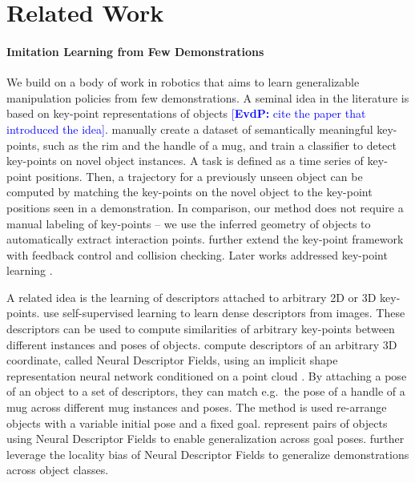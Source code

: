 \documentclass{article}
\newcommand{\evdp}[1]{\textcolor{blue}{[\textbf{EvdP:} #1]}}
\begin{document}
\section{Related Work}

\paragraph{Imitation Learning from Few Demonstrations} 

We build on a body of work in robotics that aims to learn generalizable manipulation policies from few demonstrations. A seminal idea in the literature is based on key-point representations of objects \evdp{cite the paper that introduced the idea}. \citet{manuelli19kpam} manually create a dataset of semantically meaningful key-points, such as the rim and the handle of a mug, and train a classifier to detect key-points on novel object instances. A task is defined as a time series of key-point positions. Then, a trajectory for a previously unseen object can be computed by matching the key-points on the novel object to the key-point positions seen in a demonstration. In comparison, our method does not require a manual labeling of key-points -- we use the inferred geometry of objects to automatically extract interaction points. \citet{gao21kpam,gao21kpamsc} further extend the key-point framework with feedback control and collision checking. Later works addressed key-point learning \cite{1910,vecerik20s3k,manuelli2 0keypoints,turpin21gift}.

A related idea is the learning of descriptors attached to arbitrary 2D or 3D key-points. \citet{florence18dense} use self-supervised learning to learn dense descriptors from images. These descriptors can be used to compute similarities of arbitrary key-points between different instances and poses of objects. \citet{chen22neural} compute descriptors of an arbitrary 3D coordinate, called Neural Descriptor Fields, using an implicit shape representation neural network conditioned on a point cloud \cite{mescheder19occupancy}. By attaching a pose of an object to a set of descriptors, they can match e.g.~the pose of a handle of a mug across different mug instances and poses. The method is used re-arrange objects with a variable initial pose and a fixed goal. \citet{simeonov22se,ryu22equivariant} represent pairs of objects using Neural Descriptor Fields to enable generalization across goal poses. \citet{chun23local} further leverage the locality bias of Neural Descriptor Fields to generalize demonstrations across object classes.
\end{document}
